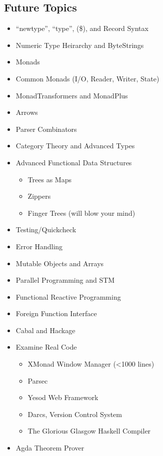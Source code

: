 \documentclass{beamer}                  %
\newcommand{\srule}{
	\rule{\textwidth}{1pt}\\
}
\newlength{\subsecwidth}
\newenvironment{slide}{
	\begin{frame} %
	\settowidth{\subsecwidth}{\insertsubsection} %
	\ifthenelse{\dimtest{\subsecwidth}{<}{1pt}}{ %
		\frametitle{\insertsection\\             %
		\vspace{-1ex}                            %
		\color{fore}\srule                       %
		\par                                     %
		\vspace{-3ex}                            %
		}
	}{                                           %
		\frametitle{\insertsection\ -- \insertsubsection\\ %
		\vspace{-1ex}                            %
		\color{fore}\srule                       %
		\par                                     %
		\vspace{-3ex}                            %
		}
	}
	\Large                                       %
}{
	\end{frame}
}
\begin{document}
\subsection{Future Topics}

\begin{slide}
  \begin{itemize}
    \item ``newtype'', ``type'', (\$), and Record Syntax
    \item Numeric Type Heirarchy and ByteStrings
    \item Monads
    \item Common Monads (I/O, Reader, Writer, State)
    \item MonadTransformers and MonadPlus
    \item Arrows
    \item Parser Combinators
    \item Category Theory and Advanced Types
    \item Advanced Functional Data Structures
      \begin{itemize}
        \item Trees as Maps
        \item Zippers
        \item Finger Trees (will blow your mind)
      \end{itemize}
  \end{itemize}
\end{slide}

\begin{slide}
  \begin{itemize}
    \item Testing/Quickcheck
    \item Error Handling
    \item Mutable Objects and Arrays
    \item Parallel Programming and STM
    \item Functional Reactive Programming
    \item Foreign Function Interface
    \item Cabal and Hackage
    \item Examine Real Code
      \begin{itemize}
        \item XMonad Window Manager (<1000 lines)
        \item Parsec
        \item Yesod Web Framework
        \item Darcs, Version Control System
        \item The Glorious Glasgow Haskell Compiler
      \end{itemize}
    \item Agda Theorem Prover
  \end{itemize}
\end{slide}
\end{document}
